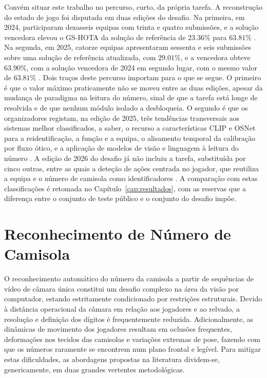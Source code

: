 Convém situar este trabalho no percurso, curto, da própria tarefa. A reconstrução do estado
de jogo foi disputada em duas edições do desafio. Na primeira, em 2024, participaram
dezasseis equipas com trinta e quatro submissões, e a solução vencedora elevou o GS-HOTA da
solução de referência de $23.36\%$ para $63.81\%$ \citep{cioppa2024soccernet}. Na segunda,
em 2025, catorze equipas apresentaram sessenta e seis submissões sobre uma solução de
referência atualizada, com $29.01\%$, e a vencedora obteve $63.90\%$, com a solução vencedora de 2024 em
segundo lugar, com o mesmo valor de $63.81\%$ \citep{giancola2025soccernet}. Dois traços deste percurso importam para o que se segue. O
primeiro é que o valor máximo praticamente não se moveu entre as duas edições, apesar da
mudança de paradigma na leitura do número, sinal de que a tarefa está longe de resolvida e de
que nenhum módulo isolado a desbloqueia. O segundo é que os
organizadores registam, na edição de 2025, três tendências transversais aos sistemas
melhor classificados, a saber, o recurso a características CLIP e OSNet para a
reidentificação, a função e a equipa, o alisamento temporal da calibração por fluxo ótico, e a
aplicação de modelos de visão e linguagem à leitura do número
\citep{giancola2025soccernet}. A edição de 2026 do desafio já não incluiu a tarefa, substituída
por cinco outras, entre as quais a deteção de ações centrada no jogador, que reutiliza a
equipa e o número de camisola como identificadores \citep{cioppa2026soccernet}. A comparação
com estas classificações é retomada no Capítulo~\ref{cap:resultados}, com as reservas que a
diferença entre o conjunto de teste público e o conjunto do desafio impõe.

\section{Reconhecimento de Número de Camisola}

O reconhecimento automático do número da camisola a partir de sequências de vídeo de câmara
única constitui um desafio complexo na área da visão por computador, estando estritamente
condicionado por restrições estruturais. Devido à distância operacional da câmara em
relação aos jogadores e ao relvado, a resolução e definição dos dígitos é frequentemente
reduzida. Adicionalmente, as dinâmicas de movimento dos jogadores resultam em oclusões
frequentes, deformações nos tecidos das camisolas e variações extremas de pose, fazendo
com que os números raramente se encontrem num plano frontal e legível. Para mitigar estas
dificuldades, as abordagens propostas na literatura dividem-se, genericamente, em duas
grandes vertentes metodológicas.

